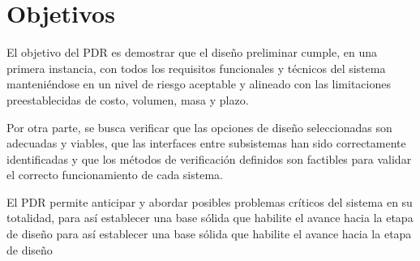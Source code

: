 \chapter{Objetivos}
El objetivo del PDR es demostrar que el diseño preliminar cumple, en una primera instancia,
con todos los requisitos funcionales y técnicos del sistema manteniéndose en un nivel
de riesgo aceptable y alineado con las limitaciones preestablecidas de costo, volumen, masa
y plazo.

Por otra parte, se busca verificar que las opciones de diseño seleccionadas son adecuadas
y viables, que las interfaces entre subsistemas han sido correctamente identificadas y que
los métodos de verificación definidos son factibles para validar el correcto funcionamiento de
cada sistema.

El PDR permite anticipar y abordar posibles problemas críticos del sistema en su totalidad, para así
establecer una base sólida que habilite el avance hacia la etapa de diseño para así establecer una
base sólida que habilite el avance hacia la etapa de diseño

